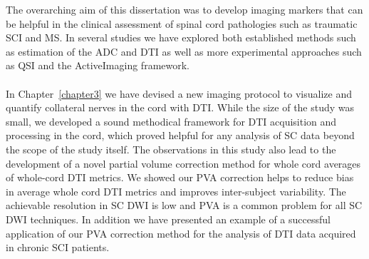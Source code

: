 The overarching aim of this dissertation was to develop imaging markers that can be helpful in the clinical assessment of spinal cord pathologies such as traumatic \gls{SCI} and \gls{MS}. In several studies we have explored both established methods such as estimation of the \gls{ADC} and \gls{DTI} as well as more experimental approaches such as \gls{QSI} and the ActiveImaging framework.
\paragraph{}
In Chapter~\ref{chapter3} we have devised a new imaging protocol to visualize and quantify collateral nerves in the cord with \gls{DTI}. While the size of the study was small, we developed a sound methodical framework for \gls{DTI} acquisition and processing in the cord, which proved helpful for any analysis of \gls{SC} data beyond the scope of the study itself. The observations in this study also lead to the development of a novel partial volume correction method for whole cord averages of whole-cord {\gls{DTI}} metrics. We showed our PVA correction helps to reduce bias in average whole cord \gls{DTI} metrics and improves inter-subject variability. The achievable resolution in {\gls{SC}} DWI is low and PVA is a common problem for all {\gls{SC}} DWI techniques. In addition we have presented an example of a successful application of our \gls{PVA} correction method for the analysis of \gls{DTI} data acquired in chronic \gls{SCI} patients. 
